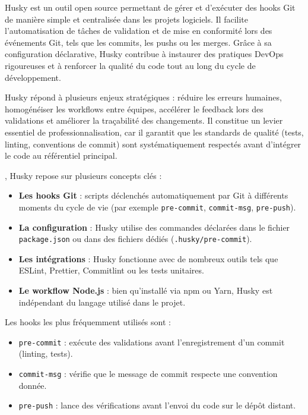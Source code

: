 Husky est un outil open source permettant de gérer et d’exécuter des hooks Git de manière simple et centralisée dans les projets logiciels. Il facilite l’automatisation de tâches de validation et de mise en conformité lors des événements Git, tels que les commits, les pushs ou les merges. Grâce à sa configuration déclarative, Husky contribue à instaurer des pratiques DevOps rigoureuses et à renforcer la qualité du code tout au long du cycle de développement.

Husky répond à plusieurs enjeux stratégiques  : réduire les erreurs humaines, homogénéiser les workflows entre équipes, accélérer le feedback lors des validations et améliorer la traçabilité des changements. Il constitue un levier essentiel de professionnalisation, car il garantit que les standards de qualité (tests, linting, conventions de commit) sont systématiquement respectés avant d’intégrer le code au référentiel principal.

, Husky repose sur plusieurs concepts clés  :
\begin{itemize}
	\item \textbf{Les hooks Git}  : scripts déclenchés automatiquement par Git à différents moments du cycle de vie (par exemple \texttt{pre-commit}, \texttt{commit-msg}, \texttt{pre-push}).
	\item \textbf{La configuration}  : Husky utilise des commandes déclarées dans le fichier \texttt{package.json} ou dans des fichiers dédiés (\texttt{.husky/pre-commit}).
	\item \textbf{Les intégrations}  : Husky fonctionne avec de nombreux outils tels que ESLint, Prettier, Commitlint ou les tests unitaires.
	\item \textbf{Le workflow Node.js}  : bien qu’installé via npm ou Yarn, Husky est indépendant du langage utilisé dans le projet.
\end{itemize}

Les hooks les plus fréquemment utilisés sont  :
\begin{itemize}
	\item \texttt{pre-commit}  : exécute des validations avant l’enregistrement d’un commit (linting, tests).
	\item \texttt{commit-msg}  : vérifie que le message de commit respecte une convention donnée.
	\item \texttt{pre-push}  : lance des vérifications avant l’envoi du code sur le dépôt distant.
\end{itemize}

